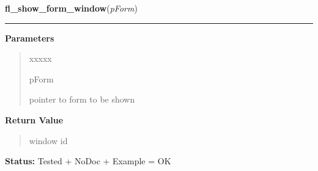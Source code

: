     \vspace{0.5ex}

\hspace{.8\funcindent}\begin{boxedminipage}{\funcwidth}

    \raggedright \textbf{fl\_show\_form\_window}(\textit{pForm})

    \vspace{-1.5ex}

    \rule{\textwidth}{0.5\fboxrule}
\setlength{\parskip}{2ex}
\setlength{\parskip}{1ex}
      \textbf{Parameters}
      \vspace{-1ex}

      \begin{quote}
        \begin{Ventry}{xxxxx}

          \item[pForm]

          pointer to form to be shown

        \end{Ventry}

      \end{quote}

      \textbf{Return Value}
    \vspace{-1ex}

      \begin{quote}
      window id

      \end{quote}

\textbf{Status:} Tested + NoDoc + Example = OK



    \end{boxedminipage}

    \label{xformslib:library:fl_adjust_form_size}

    \vspace{0.5ex}

